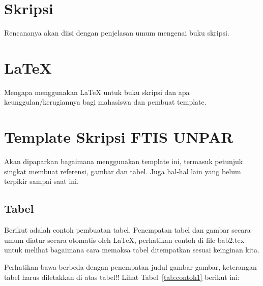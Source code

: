 































\section{Skripsi}
\label{sec:skripsi} 
 
Rencananya akan diisi dengan penjelasan umum mengenai buku skripsi.


\section{\LaTeX}
\label{sec:latex}

Mengapa menggunakan \LaTeX{} untuk buku skripsi dan apa keunggulan/kerugiannya bagi mahasiswa dan pembuat template. 



\section{Template Skripsi FTIS UNPAR}
\label{sec:template}
 
Akan dipaparkan bagaimana menggunakan template ini, termasuk petunjuk singkat membuat referensi, gambar dan tabel.
Juga hal-hal lain yang belum terpikir sampai saat ini. 
 

\subsection{Tabel}  
Berikut adalah contoh pembuatan tabel. 
Penempatan tabel dan gambar secara umum diatur secara otomatis oleh \LaTeX{}, perhatikan contoh di file bab2.tex untuk melihat bagaimana cara memaksa tabel ditempatkan sesuai keinginan kita.

Perhatikan bawa berbeda dengan penempatan judul gambar gambar, keterangan tabel harus diletakkan di atas tabel!!
Lihat Tabel~\ref{tab:contoh1} berikut ini:

